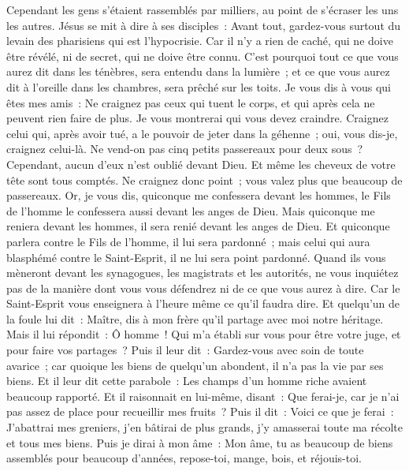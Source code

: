 \begin{multicols}{2}
\VerseOne{}Cependant les gens s'étaient rassemblés par milliers, au point de s'écraser les uns les autres. Jésus se mit à dire à ses disciples~: Avant tout, gardez-vous surtout du levain des pharisiens qui est l'hypocrisie.
Car il n'y a rien de caché, qui ne doive être révélé, ni de secret, qui ne doive être connu.
C'est pourquoi tout ce que vous aurez dit dans les ténèbres, sera entendu dans la lumière~; et ce que vous aurez dit à l'oreille dans les chambres, sera prêché sur les toits.
Je vous dis à vous qui êtes mes amis~: Ne craignez pas ceux qui tuent le corps, et qui après cela ne peuvent rien faire de plus.
Je vous montrerai qui vous devez craindre. Craignez celui qui, après avoir tué, a le pouvoir de jeter dans la géhenne~; oui, vous dis-je, craignez celui-là.
Ne vend-on pas cinq petits passereaux pour deux sous~? Cependant, aucun d'eux n'est oublié devant Dieu.
Et même les cheveux de votre tête sont tous comptés. Ne craignez donc point~; vous valez plus que beaucoup de passereaux.
Or, je vous dis, quiconque me confessera devant les hommes, le Fils de l'homme le confessera aussi devant les anges de Dieu.
Mais quiconque me reniera devant les hommes, il sera renié devant les anges de Dieu.
Et quiconque parlera contre le Fils de l'homme, il lui sera pardonné~; mais celui qui aura blasphémé contre le Saint-Esprit, il ne lui sera point pardonné.
Quand ils vous mèneront devant les synagogues, les magistrats et les autorités, ne vous inquiétez pas de la manière dont vous vous défendrez ni de ce que vous aurez à dire.
Car le Saint-Esprit vous enseignera à l'heure même ce qu'il faudra dire.
Et quelqu'un de la foule lui dit~: Maître, dis à mon frère qu'il partage avec moi notre héritage.
Mais il lui répondit~: Ô homme~! Qui m'a établi sur vous pour être votre juge, et pour faire vos partages~?
Puis il leur dit~: Gardez-vous avec soin de toute avarice~; car quoique les biens de quelqu'un abondent, il n'a pas la vie par ses biens.
Et il leur dit cette parabole~: Les champs d'un homme riche avaient beaucoup rapporté.
Et il raisonnait en lui-même, disant~: Que ferai-je, car je n'ai pas assez de place pour recueillir mes fruits~?
Puis il dit~: Voici ce que je ferai~: J'abattrai mes greniers, j'en bâtirai de plus grands, j'y amasserai toute ma récolte et tous mes biens.
Puis je dirai à mon âme~: Mon âme, tu as beaucoup de biens assemblés pour beaucoup d'années, repose-toi, mange, bois, et réjouis-toi.

\end{multicols}

